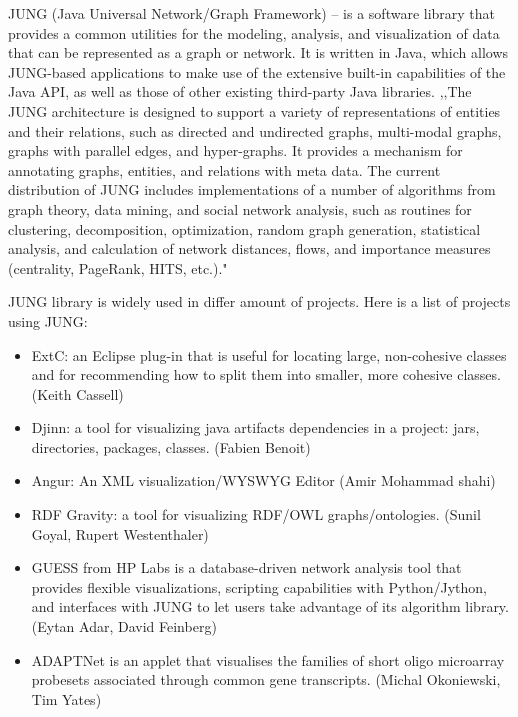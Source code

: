 \begin{enumerate}
JUNG (Java Universal Network/Graph Framework) -- is a software library that provides a common utilities for the modeling, analysis, and visualization of data that can be represented as a graph or network. It is written in Java, which allows JUNG-based applications to make use of the extensive built-in capabilities of the Java API, as well as those of other existing third-party Java libraries. ,,The JUNG architecture is designed to support a variety of representations of entities and their relations, such as directed and undirected graphs, multi-modal graphs, graphs with parallel edges, and hyper-graphs. It provides a mechanism for annotating graphs, entities, and relations with meta data. The current distribution of JUNG includes implementations of a number of algorithms from graph theory, data mining, and social network analysis, such as routines for clustering, decomposition, optimization, random graph generation, statistical analysis, and calculation of network distances, flows, and importance measures (centrality, PageRank, HITS, etc.)."~\cite{JUNG_OVERVIEW}


JUNG library is widely used in differ amount of projects. Here is a list of projects using JUNG:

\begin{itemize}

\item ExtC: an Eclipse plug-in that is useful for locating large, non-cohesive classes and for recommending how to split them into smaller, more cohesive classes. (Keith Cassell)~\cite{EXTC}

\item Djinn: a tool for visualizing java artifacts dependencies in a project: jars, directories, packages, classes. (Fabien Benoit)~\cite{DJINN}

\item Angur: An XML visualization/WYSWYG Editor (Amir Mohammad shahi)~\cite{ANGUR}

\item RDF Gravity: a tool for visualizing RDF/OWL graphs/ontologies. (Sunil Goyal, Rupert Westenthaler)~\cite{RDF_GRAVITY}

\item GUESS from HP Labs is a database-driven network analysis tool that provides flexible visualizations, scripting capabilities with Python/Jython, and interfaces with JUNG to let users take advantage of its algorithm library. (Eytan Adar, David Feinberg)~\cite{GUESS}

\item ADAPTNet is an applet that visualises the families of short oligo microarray probesets associated through common gene transcripts. (Michal Okoniewski, Tim Yates)~\cite{ADAPTNET}


\end{itemize}
\end{enumerate}
